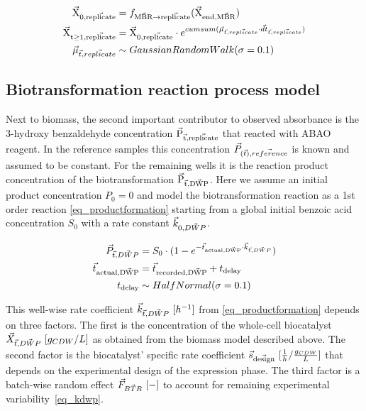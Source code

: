 \documentclass[sn-standardnature]{sn-jnl}%
\def\vec{\mathaccent "017E\relax }
\theoremstyle{thmstyleone}%
\theoremstyle{thmstyletwo}%
\theoremstyle{thmstylethree}%
\begin{document}
\begin{equation}
\begin{aligned}
    \mathrm{\vec{X}_{0,\vec{replicate}}} &= f_\mathrm{\vec{MBR}\rightarrow \vec{replicate}}(\mathrm{\vec{X}_{end,\vec{MBR}}}) \\
    \mathrm{\vec{X}_{t \ge 1,\vec{replicate}}} &= \mathrm{\vec{X}_{0,\vec{replicate}}} \cdot e^{cumsum(\vec{\mu}_{\vec{t},\vec{replicate}} \cdot \vec{dt}_{\vec{t},\vec{replicate}})}\\
    \vec{\mu}_{\vec{t},\vec{replicate}} &\sim GaussianRandomWalk(\sigma=0.1) \\
\end{aligned}
\label{eq_Xrandomwalk}
\end{equation}


\subsection{Biotransformation reaction process model}
\label{sec_product_model}

Next to biomass, the second important contributor to observed absorbance is the 3-hydroxy benzaldehyde concentration $\mathrm{\vec{P}_{\vec{t},\vec{replicate}}}$ that reacted with ABAO reagent.
In the reference samples this concentration $\vec{P}_{(\vec{t}),\vec{reference}}$ is known and assumed to be constant.
For the remaining wells it is the reaction product concentration of the biotransformation $\mathrm{\vec{P}_{\vec{t},\vec{DWP}}}$.
Here we assume an initial product concentration $P_0=0$ and model the biotransformation reaction as a 1st order reaction \eqref{eq_productformation} starting from a global initial benzoic acid concentration $S_0$ with a rate constant $\vec{k}_{0,\vec{DWP}}$.

\begin{equation}
\begin{aligned}
    \vec{P}_{\vec{t},\vec{DWP}} &= S_0 \cdot (1 - e^{-\vec{t}_\mathrm{actual,\vec{DWP}} \cdot \vec{k}_{\vec{t},\vec{DWP}}}) \\
    \vec{t}_\mathrm{actual,\vec{DWP}} &= \vec{t}_\mathrm{recorded,\vec{DWP}} + t_\mathrm{delay} \\
    t_\mathrm{delay} &\sim HalfNormal(\sigma = 0.1)
\end{aligned}
\label{eq_productformation}
\end{equation}

This well-wise rate coefficient $\vec{k}_{\vec{t},\vec{DWP}}\ [h^{-1}]$ from \eqref{eq_productformation} depends on three factors.
The first is the concentration of the whole-cell biocatalyst $\vec{X}_{\vec{t},\vec{DWP}}\ [g_{CDW}/L]$ as obtained from the biomass model described above.
The second factor is the biocatalyst' specific rate coefficient $\vec{s}_\mathrm{\vec{design}}\ [\frac{1}{h} / \frac{g_{CDW}}{L}]$ that depends on the experimental design of the expression phase.
The third factor is a batch-wise random effect $\vec{F}_{\vec{BTR}}\ [-]$ to account for remaining experimental variability~\eqref{eq_kdwp}.
\end{document}
